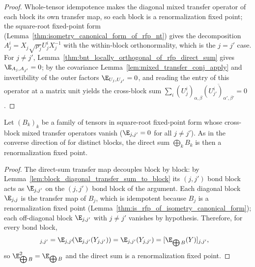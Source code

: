 \begin{proof}\leanok
    Whole-tensor idempotence makes the diagonal mixed transfer operator of each
    block its own transfer map, so each block is a renormalization fixed
    point; the square-root fixed-point form
    (Lemma~\ref{thm:isometry_canonical_form_of_rfp_nt}) gives the
    decomposition $A_j^i=X_j\sqrt{\rho_j}U_j^iX_j^{-1}$ with the within-block
    orthonormality, which is the $j=j'$ case. For $j\ne j'$,
    Lemma~\ref{thm:bnt_locally_orthogonal_of_rfp_direct_sum} gives
    $\E_{A_j,A_{j'}}=0$; by the covariance
    Lemma~\ref{lem:mixed_transfer_conj_apply} and invertibility of the outer
    factors $\E_{U_j,U_{j'}}=0$, and reading the entry of this operator at a
    matrix unit yields the cross-block sum
    $\sum_i(U_j^i)_{\alpha,\beta}
        \overline{(U_{j'}^i)_{\alpha',\beta'}}=0$.
\end{proof}

\begin{lemma}%
    \label{thm:is_rfp_of_isometry_canonical_form_direct_sum}
    \leanok
    Let $(B_k)_k$ be a family of tensors in square-root fixed-point form whose
    cross-block mixed transfer operators vanish ($\E_{j,j'}=0$ for all
    $j\ne j'$). As in the converse direction of
    \cite[Section~3]{Cirac2016MPDO_arXiv} for distinct blocks, the direct sum
    $\bigoplus_k B_k$ is then a renormalization fixed point.
\end{lemma}
\begin{proof}\leanok
    The direct-sum transfer map decouples block by block: by
    Lemma~\ref{lem:block_diagonal_transfer_sum_to_block} its $(j,j')$ bond block
    acts as $\E_{j,j'}$ on the $(j,j')$ bond block of the argument. Each diagonal
    block $\E_{j,j}$ is the transfer map of $B_j$, which is idempotent because
    $B_j$ is a renormalization fixed point
    (Lemma~\ref{thm:is_rfp_of_isometry_canonical_form}); each off-diagonal block
    $\E_{j,j'}$ with $j\ne j'$ vanishes by hypothesis. Therefore, for every bond
    block,
    \begin{align}
        [\E_{\bigoplus B}^2(Y)]_{j,j'}
         & =\E_{j,j'}\!(\E_{j,j'}(Y_{j,j'}))
        =\E_{j,j'}(Y_{j,j'})
        =[\E_{\bigoplus B}(Y)]_{j,j'},
        \notag
    \end{align}
    so $\E_{\bigoplus B}^2=\E_{\bigoplus B}$ and the direct
    sum is a renormalization fixed point.
\end{proof}

